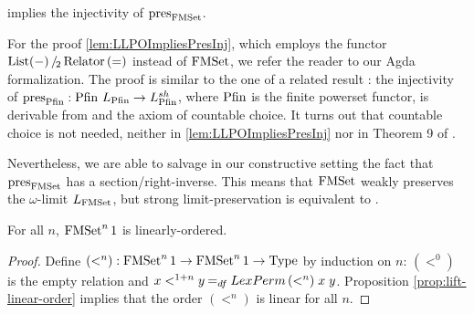\documentclass[a4paper,USenglish,cleveref]{lipics-v2021}
\begin{document}
\begin{theorem}\label{lem:LLPOImpliesPresInj}
  \LLPO{} implies the injectivity of $\pres{\FMSet}$.
\end{theorem}
For the proof \cref{lem:LLPOImpliesPresInj}, which employs the functor $\SetQuot[\List (-)][\Relator\,(=)]$ instead of $\FMSet$, we refer the reader to our Agda formalization.  The proof is similar to the one of a related result \cite[Theorem 9]{Veltri2021}: the injectivity of $\pres{\Op{Pfin}} : \Op{Pfin} \,\Lim{\Op{Pfin}} \to \LimSh{\Op{Pfin}}$, where $\Op{Pfin}$ is the finite powerset functor, is derivable from \LLPO{} and the axiom of countable choice. It turns out that countable choice is not needed, neither in \cref{lem:LLPOImpliesPresInj} nor in Theorem 9 of \cite{Veltri2021}.

Nevertheless, we are able to salvage in our constructive setting the fact that $\pres{\FMSet}$ has a section/right-inverse. This means that $\FMSet$ weakly preserves the $\omega$-limit $\Lim{\FMSet}$, but strong limit-preservation is equivalent to \LLPO{}.
\begin{lemma}\label{lem:iter-linear}
For all $n$, $\FMSet^n 1$ is linearly-ordered.
\end{lemma}
\begin{proof}
Define $(<^n) : \FMSet^n 1 \to \FMSet^n 1 \to \Type$ by induction on $n$: $(<^0)$ is the empty relation and $x <^{1 + n} y \DefEq \LexPerm\,(<^n)\;x\;y$. Proposition \ref{prop:lift-linear-order} implies that the order $(<^n)$ is linear for all $n$.
\end{proof}
\end{document}
